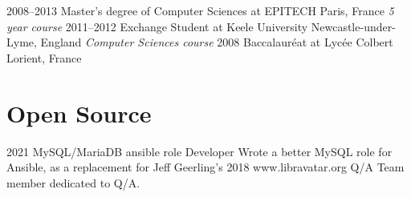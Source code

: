 \documentclass[hidelinks]{friggeri-cv} %
\begin{document}
\begin{entrylist}
\entry
{2008--2013}
{Master's degree {\normalfont of Computer Sciences at EPITECH}}
{Paris, France}
{\emph{5 year course}}
\entry
{2011--2012}
{Exchange Student {\normalfont at Keele University}}
{Newcastle-under-Lyme, England}
{\emph{Computer Sciences course}}
\entry
{2008}
{Baccalauréat {\normalfont at Lycée Colbert}}
{Lorient, France}
{}
\end{entrylist}


\section{Open Source}
\begin{entrylist}
\entry
{2021}
{MySQL/MariaDB ansible role}
{Developer}
{Wrote a better MySQL role for Ansible, as a replacement for Jeff Geerling's} 
\entry
{2018}
{www.libravatar.org}
{Q/A}
{Team member dedicated to Q/A.}
\end{entrylist}
\end{document}
